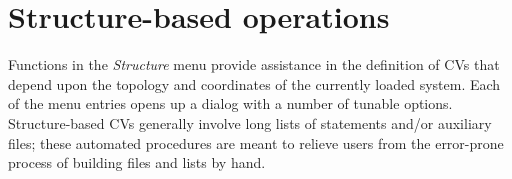 \documentclass[preprint,review,11pt]{elsarticle}
\begin{document}
\section{Structure-based operations}


Functions in the \emph{Structure} menu provide assistance in the
definition of CVs that depend upon the topology and coordinates of
the currently loaded system.  Each of the menu entries opens up a
dialog with a number of tunable options. Structure-based CVs
generally involve long lists of statements and/or auxiliary files;
these automated procedures are meant to relieve users from the error-prone
process of building files and lists by hand.
\end{document}
